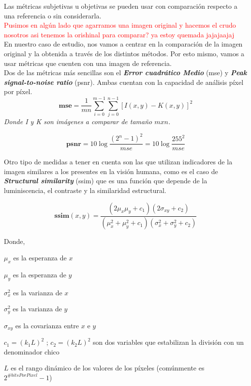 \documentclass[a4paper]{article}
\begin{document}
Las métricas subjetivas u objetivas se pueden usar con comparación respecto a una referencia o sin considerarla.\\

\textcolor{red}{Pusimos en alg\'un lado que agarramos una imagen original y hacemos el crudo nosotros asi tenemos la orishinal para comparar? ya estoy quemada jajajaajaj}\\

En nuestro caso de estudio, nos vamos a centrar en la comparaci\'on de la imagen original y la obtenida a trav\'es de los distintos m\'etodos. Por esto mismo, vamos a usar m\'etricas que cuenten con una imagen de referencia.\\

 Dos de las m\'etricas m\'as sencillas son el \emph{\textbf{Error cuadr\'atico Medio}} (mse) y \emph{\textbf{Peak signal-to-noise ratio}} (psnr). Ambas cuentan con la capacidad de an\'alisis p\'ixel por p\'ixel.\\

\[
 \textbf{mse} = \frac{1}{mn} \sum_{i=0}^{m-1} \sum_{j=0}^{n-1} [I(x,y) - K(x,y)]^2
\]
  \indent \indent \indent \textit{Donde I y K son imágenes a comparar de tamaño $mxn$.}



\[
 \textbf{psnr} = 10 \log \frac{(2^n-1)^2}{mse} = 10 \log \frac{255^2}{mse}
\]

Otro tipo de medidas a tener en cuenta son las que utilizan indicadores de la imagen similares a los presentes en la visi\'on humana, como es el caso de \emph{\textbf{Structural similarity}} (ssim) que es una funci\'on que depende de la luminiscencia, el contraste y la similaridad estructural.

\[
 \textbf{ssim}(x,y) = \frac{(2\mu_x\mu_y+c_1)(2\sigma_{xy}+c_2)}{(\mu_x^2+\mu_y^2+c_1)(\sigma_x^2+\sigma_y^2+c_2)}
\]

\noindent Donde, 

$\mu_x$ es la esperanza de $x$

$\mu_y$ es la esperanza de $y$

$\sigma_x^2$ es la varianza de $x$

$\sigma_y^2$ es la varianza de $y$

$\sigma_{xy}$ es la covarianza entre $x$ e $y$

$c_1 = (k_1L)^2$ ; $c_2 = (k_2L)^2$ son dos variables que estabilizan la divisi\'on con un denominador chico

$L$ es el rango din\'amico de los valores de los p\'ixeles (com\'unmente es $2^{\#bitsPorPixel}-1$)
\end{document}
